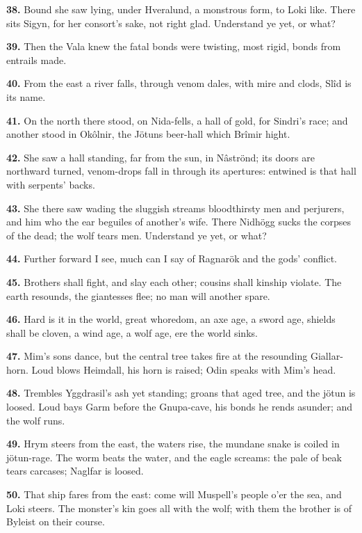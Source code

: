 \textbf{38.} Bound she saw lying, under Hveralund, a monstrous form, to Loki
like. There sits Sigyn, for her consort's sake, not right glad.
Understand ye yet, or what?

\textbf{39.} Then the Vala knew the fatal bonds were twisting, most rigid,
bonds from entrails made.

\textbf{40.} From the east a river falls, through venom dales, with mire and
clods, Slîd is its name.

\textbf{41.} On the north there stood, on Nida-fells, a hall of gold, for
Sindri's race; and another stood in Okôlnir, the Jötuns beer-hall
which Brîmir hight.

\textbf{42.} She saw a hall standing, far from the sun, in Nâströnd; its
doors are northward turned, venom-drops fall in through its apertures:
entwined is that hall with serpents' backs.

\textbf{43.} She there saw wading the sluggish streams bloodthirsty men and
perjurers, and him who the ear beguiles of another's wife. There
Nidhögg sucks the corpses of the dead; the wolf tears men. Understand
ye yet, or what?

\textbf{44.} Further forward I see, much can I say of Ragnarök and the gods'
conflict.

\textbf{45.} Brothers shall fight, and slay each other; cousins shall kinship
violate. The earth resounds, the giantesses flee; no man will another
spare.

\textbf{46.} Hard is it in the world, great whoredom, an axe age, a sword
age, shields shall be cloven, a wind age, a wolf age, ere the world
sinks.

\textbf{47.} Mim's sons dance, but the central tree takes fire at the
resounding Giallar-horn. Loud blows Heimdall, his horn is raised; Odin
speaks with Mim's head.

\textbf{48.} Trembles Yggdrasil's ash yet standing; groans that aged tree,
and the jötun is loosed. Loud bays Garm before the Gnupa-cave, his
bonds he rends asunder; and the wolf runs.

\textbf{49.} Hrym steers from the east, the waters rise, the mundane snake is
coiled in jötun-rage. The worm beats the water, and the eagle screams:
the pale of beak tears carcases; Naglfar is loosed.

\textbf{50.} That ship fares from the east: come will Muspell's people o'er
the sea, and Loki steers. The monster's kin goes all with the wolf;
with them the brother is of Byleist on their course.


